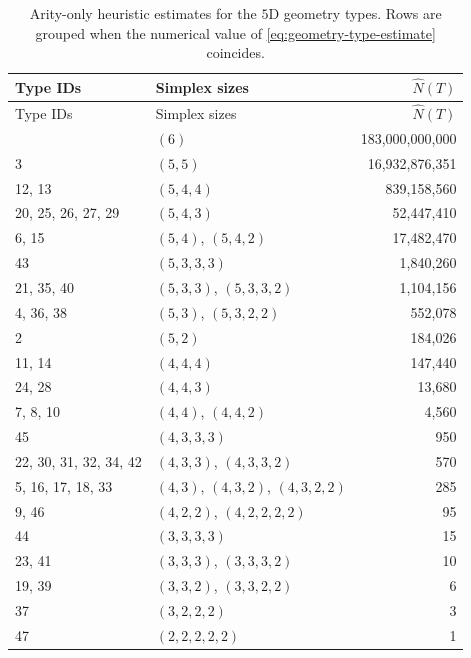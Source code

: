 \begingroup
\small
\setlength{\tabcolsep}{6pt}
\renewcommand{\arraystretch}{1.05}
\begin{longtable}{@{}p{3.8cm}>{\raggedright\arraybackslash}p{5.7cm}r@{}}
\caption{Arity-only heuristic estimates for the $5$D geometry types.  Rows are grouped when the numerical value of \cref{eq:geometry-type-estimate} coincides.}
\label{tab:5d-cws-estimates}\\
\toprule
Type IDs & Simplex sizes & $\widehat N(T)$ \\
\midrule
\endfirsthead
\toprule
Type IDs & Simplex sizes & $\widehat N(T)$ \\
\midrule
\endhead
\bottomrule
\endfoot
1 & $(6)$ & 183,000,000,000 \\
3 & $(5,5)$ & 16,932,876,351 \\
12, 13 & $(5,4,4)$ & 839,158,560 \\
20, 25, 26, 27, 29 & $(5,4,3)$ & 52,447,410 \\
6, 15 & $(5,4)$, $(5,4,2)$ & 17,482,470 \\
43 & $(5,3,3,3)$ & 1,840,260 \\
21, 35, 40 & $(5,3,3)$, $(5,3,3,2)$ & 1,104,156 \\
4, 36, 38 & $(5,3)$, $(5,3,2,2)$ & 552,078 \\
2 & $(5,2)$ & 184,026 \\
11, 14 & $(4,4,4)$ & 147,440 \\
24, 28 & $(4,4,3)$ & 13,680 \\
7, 8, 10 & $(4,4)$, $(4,4,2)$ & 4,560 \\
45 & $(4,3,3,3)$ & 950 \\
22, 30, 31, 32, 34, 42 & $(4,3,3)$, $(4,3,3,2)$ & 570 \\
5, 16, 17, 18, 33 & $(4,3)$, $(4,3,2)$, $(4,3,2,2)$ & 285 \\
9, 46 & $(4,2,2)$, $(4,2,2,2,2)$ & 95 \\
44 & $(3,3,3,3)$ & 15 \\
23, 41 & $(3,3,3)$, $(3,3,3,2)$ & 10 \\
19, 39 & $(3,3,2)$, $(3,3,2,2)$ & 6 \\
37 & $(3,2,2,2)$ & 3 \\
47 & $(2,2,2,2,2)$ & 1 \\
\end{longtable}
\endgroup